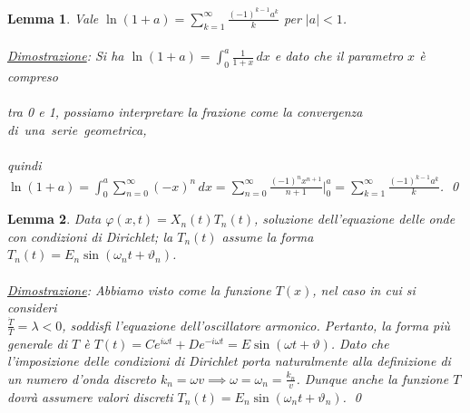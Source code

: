\documentclass[a4paper,12pt]{report}
\newtheorem{lemma}{Lemma}[chapter]
\newcommand{\lt}{<}
\begin{document}
\begin{lemma}\label{app. 3}
    Vale $\ln(1+a)=\displaystyle\sum_{k=1}^\infty\frac{(-1)^{k-1}a^k}{k}$ per $|a|\lt 1$.
    \\
    \\ \underline{Dimostrazione}: Si ha $\ln(1+a)=\displaystyle\int_0^a\frac{1}{1+x}\,dx
    $ e dato che il parametro $x$ è compreso 
    \\
    \\tra 0 e 1, possiamo interpretare la frazione come la convergenza di\mbox{ una serie geometrica,} 
    \\
    \\quindi $\ln(1+a)=\displaystyle\int_0^a\sum_{n=0}^\infty(-x)^n\,dx=\sum_{n=0}^\infty \frac{(-1)^nx^{n+1}}{n+1}\bigg|_0^a=\sum_{k=1}^\infty\frac{(-1)^{k-1}a^k}{k}$. \qed
\end{lemma}

\newpage

\begin{lemma}\label{app: .4}
    Data $\varphi(x,t)=X_n(t)T_n(t)$, soluzione dell'equazione delle onde con condizioni di Dirichlet; la $T_n(t)$ assume la forma $T_n(t)=E_n\sin(\omega_nt+\vartheta_n)$.
    \\
    \\ \underline{Dimostrazione}: Abbiamo visto come la funzione $T(x)$, nel caso in cui si consideri 
    \\$\frac{\ddot{T}}{T}=\lambda\lt0$, soddisfi l'equazione dell'oscillatore armonico. Pertanto, la forma più generale di $T$ è $T(t)=Ce^{i\omega t}+De^{-i\omega t}=E\sin(\omega t+\vartheta)$. Dato che l'imposizione delle condizioni di Dirichlet porta naturalmente alla definizione di un numero d'onda discreto $k_n=\omega v\implies \omega=\omega_n=\frac{k_n}{v}$. Dunque anche la funzione $T$ dovrà assumere valori discreti $T_n(t)=E_n\sin(\omega_nt+\vartheta_n)$. \qed
\end{lemma}
\end{document}
